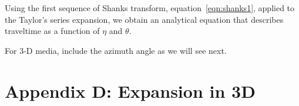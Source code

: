 Using the first sequence of Shanks transform, equation~\ref{eqn:shanks1}, applied to the Taylor's series expansion, we obtain an
analytical equation that describes traveltime as a function of $\eta$ and $\theta$. 

\begin{comment}
the following:
\beqa
\tau(x,z)=\sqrt{\frac{x^2}{v^2}+\frac{z^2}{v_t^2}} \left( \frac{ 2
   \left(v^{2}-v_t^{2}\right) z \sin ^3\theta \left(v_t^{2} x^4-v^{2} z^4\right) \left(v^2 z^2+v_t^2
   x^2\right) \left(\left(3 v^2+v_t^2\right) x^2+4 v^2 z^2\right)}{2 \left(v^2 z^2+v_t^2 x^2\right){}^2
   \left(2 v^4 z^3 \left(3 x^2 \sin\theta+x z+4 z^2 \sin (\theta
   )\right)+2 v_t^2 v^2 x^2 z \left(3 x^2 \sin\theta+6 x z \eta +2 x
   z+5 z^2 \sin\theta\right)+v_t^4 x^4 (x (3 \eta +2)+2 z \sin
  \theta)\right)} + \right. \nonumber \\ \frac{2 x
   \left(v^2 z^2+v_t^2 x^2\right){}^2 \left(2 v^4 z^4+4 v^2 v_t^2 x^2
   z^2 (3 \eta +1)+v_t^4 x^4 (\eta +2)\right)}{2 \left(v^2 z^2+v_t^2 x^2\right){}^2
   \left(2 v^4 z^3 \left(3 x^2 \sin\theta+x z+4 z^2 \sin (\theta
   )\right)+2 v_t^2 v^2 x^2 z \left(3 x^2 \sin\theta+6 x z \eta +2 x
   z+5 z^2 \sin\theta\right)+v_t^4 x^4 (x (3 \eta +2)+2 z \sin
  \theta)\right)} + \nonumber \\  \left.
      \frac{x \sin ^2\theta
   \left(18 v^6 \left(v_t^2-v^2\right) z^8-4 v_t^4 x^6 z^2 \left(v^4 (6
   \eta +2)+v_t^2 v^2 (9 \eta -1)+v_t^4 (\eta -1)\right)-v^2 v_t^2 x^4
   z^4 \left(22 v^4+v_t^2 v^2 (99 \eta +4)+v_t^4 (29 \eta -26)\right)-4
   v^4 x^2 z^6 \left(3 v^4+v_t^2 v^2 (3 \eta +7)+v_t^4 (13 \eta
   -10)\right)+\left(v-v_t\right) v_t^6 \left(v+v_t\right) x^8 (3 \eta
   +2)\right)+2 z \sin\theta \left(8 v^8 z^8+v_t^6 x^8 \left(v^2
   (4-15 \eta )-v_t^2 (\eta -4)\right)+v^2 v_t^4 x^6 z^2 \left(3 v^2
   (4-9 \eta )-5 v_t^2 (\eta -4)\right)+4 v^6 \left(v^2+7 v_t^2\right)
   x^2 z^6-4 v^4 v_t^2 x^4 z^4 \left(3 v^2 (\eta -1)+v_t^2 (\eta
   -9)\right)\right)}{2 \left(v^2 z^2+v_t^2 x^2\right){}^2
   \left(2 v^4 z^3 \left(3 x^2 \sin\theta+x z+4 z^2 \sin (\theta
   )\right)+2 v_t^2 v^2 x^2 z \left(3 x^2 \sin\theta+6 x z \eta +2 x
   z+5 z^2 \sin\theta\right)+v_t^4 x^4 (x (3 \eta +2)+2 z \sin
  \theta)\right)}  \right).
\label{eqn:homo5}
\eeqa
\end{comment}

For 3-D media,   include the azimuth angle as we will see next.


\appendix
\section{Appendix D: Expansion in 3D}

